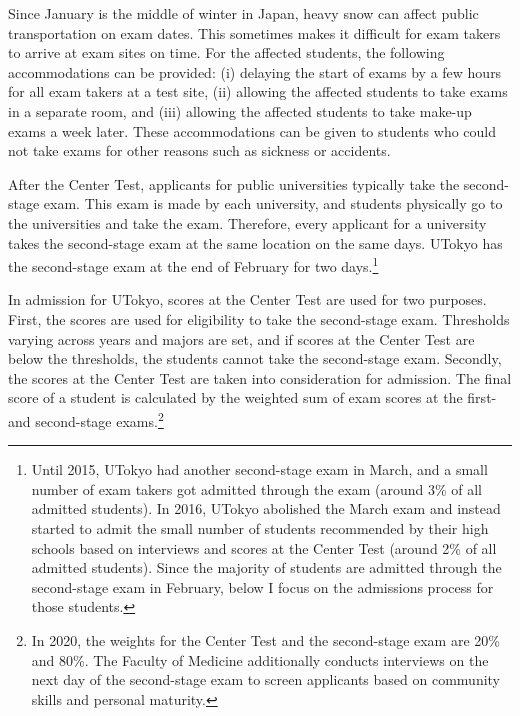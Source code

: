 \documentclass[12pt,letterpaper]{article}
\begin{document}
Since January is the middle of winter in Japan, heavy snow can affect public transportation on exam dates.
This sometimes makes it difficult for exam takers to arrive at exam sites on time.
For the affected students, the following accommodations can be provided:
(i) delaying the start of exams by a few hours for all exam takers at a test site,
(ii) allowing the affected students to take exams in a separate room, and
(iii) allowing the affected students to take make-up exams a week later.
These accommodations can be given to students who could not take exams for other reasons such as sickness or accidents.

After the Center Test, applicants for public universities typically take the second-stage exam.
This exam is made by each university, and students physically go to the universities and take the exam.
Therefore, every applicant for a university takes the second-stage exam at the same location on the same days.
UTokyo has the second-stage exam at the end of February for two days.\footnote{
  Until 2015, UTokyo had another second-stage exam in March, and a small number of exam takers got admitted through the exam (around 3\% of all admitted students).
  In 2016, UTokyo abolished the March exam and instead started to admit the small number of students recommended by their high schools based on interviews and scores at the Center Test (around 2\% of all admitted students).
  Since the majority of students are admitted through the second-stage exam in February, below I focus on the admissions process for those students. 
}

In admission for UTokyo, scores at the Center Test are used for two purposes.
First, the scores are used for eligibility to take the second-stage exam.
Thresholds varying across years and majors are set, and if scores at the Center Test are below the thresholds, the students cannot take the second-stage exam.
Secondly, the scores at the Center Test are taken into consideration for admission.
The final score of a student is calculated by the weighted sum of exam scores at the first- and second-stage exams.\footnote{
  In 2020, the weights for the Center Test and the second-stage exam are 20\% and 80\%.
  The Faculty of Medicine additionally conducts interviews on the next day of the second-stage exam to screen applicants based on community skills and personal maturity.
}

\end{document}
